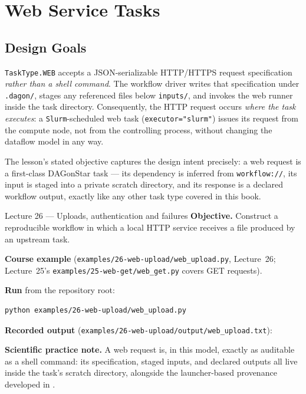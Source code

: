 \chapter{Web Service Tasks}
\label{ch:web-tasks}

\section{Design Goals}

\texttt{TaskType.WEB} accepts a JSON-serializable HTTP/HTTPS request
specification \emph{rather than a shell command}. The workflow driver writes
that specification under \texttt{.dagon/}, stages any referenced files below
\texttt{inputs/}, and invokes the web runner inside the task directory.
Consequently, the HTTP request occurs \emph{where the task executes}: a
\texttt{Slurm}-scheduled web task (\texttt{executor="slurm"}) issues its
request from the compute node, not from the controlling process, without
changing the dataflow model in any way.

\begin{practicebox}
The lesson's stated objective captures the design intent precisely: a web
request is a first-class DAGonStar task --- its dependency is inferred from
\texttt{workflow://}, its input is staged into a private scratch directory,
and its response is a declared workflow output, exactly like any other task
type covered in this book.
\end{practicebox}

\begin{lessonbox}{Lecture 26 --- Uploads, authentication and failures}
\textbf{Objective.} Construct a reproducible workflow in which a local HTTP
service receives a file produced by an upstream task.

\textbf{Course example} (\texttt{examples/26-web-upload/web\_upload.py}, Lecture~26; Lecture~25's \texttt{examples/25-web-get/web\_get.py} covers GET requests).


\textbf{Run} from the repository root:
\begin{lstlisting}[style=bash]
python examples/26-web-upload/web_upload.py
\end{lstlisting}

\textbf{Recorded output} (\texttt{examples/26-web-upload/output/web\_upload.txt}):


\textbf{Scientific practice note.} A web request is, in this model, exactly
as auditable as a shell command: its specification, staged inputs, and
declared outputs all live inside the task's scratch directory, alongside the
launcher-based provenance developed in .
\end{lessonbox}

